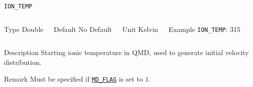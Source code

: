 \begin{frame}[allowframebreaks]{\texttt{ION\_TEMP}} \label{ION_TEMP}
\vspace*{-12pt}
\begin{columns}
\begin{block}{Type}
Double
\end{block}

\begin{block}{Default}
No Default
\end{block}

\begin{block}{Unit}
Kelvin
\end{block}

\begin{block}{Example}
\texttt{ION\_TEMP}: 315
\end{block}
\end{columns}

\begin{block}{Description}
Starting ionic temperature in QMD, used to generate initial velocity distribution.
\end{block}

\begin{block}{Remark}
Must be specified if \hyperlink{MD_FLAG}{\texttt{MD\_FLAG}} is set to $1$.
\end{block}

\end{frame}



